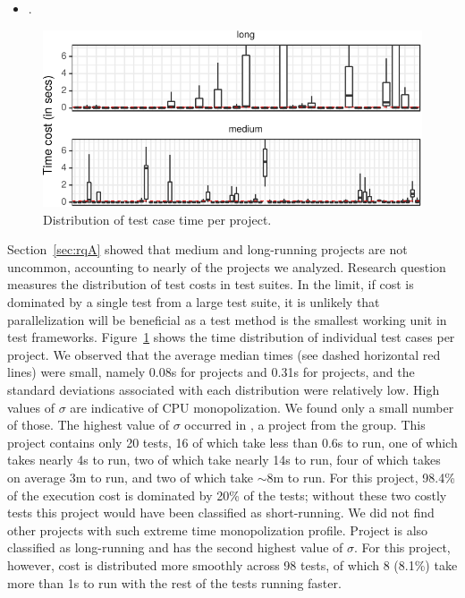 \documentclass[10pt,journal,compsoc]{IEEEtran}
\begin{document}
\begin{itemize}
  \item \numRQFeasibilityTwo. \textbf{\RQFeasibilityTwo}
\end{itemize}

\begin{figure}[t!]
  \centering
  \includegraphics[width=.48\textwidth]{results/testcost-distribution.pdf}
  \vspace{-2mm}
  \caption{\label{fig:time-distributions}Distribution of test case time per project.}%
  \vspace{-5mm}
\end{figure}

Section~\ref{sec:rqA} showed that medium and long-running projects are
not uncommon, accounting to nearly \percentMedLongRunning{} of the
\numSubjs{} projects we analyzed.  Research question \numRQFeasibilityTwo{}
measures the distribution of test costs in test suites.  In
the limit, if cost is dominated by a single test from a large test
suite, it is unlikely that parallelization will be beneficial as a
test method is the smallest working unit in test frameworks.
Figure~\ref{fig:time-distributions} shows the time distribution of
individual test cases per project.
We observed that the average median times (see dashed horizontal red
lines) were small, namely 0.08s
for \medg{} projects and 0.31s for \longg{} projects, and the standard deviations associated with each distribution were
relatively low. High values of
$\sigma$ are indicative of CPU monopolization. We found only a small number
of those. The highest value of $\sigma$ occurred in
, a project from the \longg{} group.
This project contains only 20 tests, 16 of which take less than 0.6s
to run, one of which takes nearly 4s to run, two of which take nearly
14s to run, four of which takes on average 3m to run, and two of which
take $\sim$8m to run.
For this project, 98.4\% of the execution cost is dominated by 20\% of
the tests; without these two costly tests this project would have been
classified as short-running.
We did not find other projects with such extreme time monopolization
profile.
Project  is also classified as
long-running and has the second highest value of $\sigma$.
For this project, however, cost is distributed more smoothly across 98
tests, of which 8 (8.1\%) take more than 1s to run with the rest of
the tests running faster.
\end{document}
